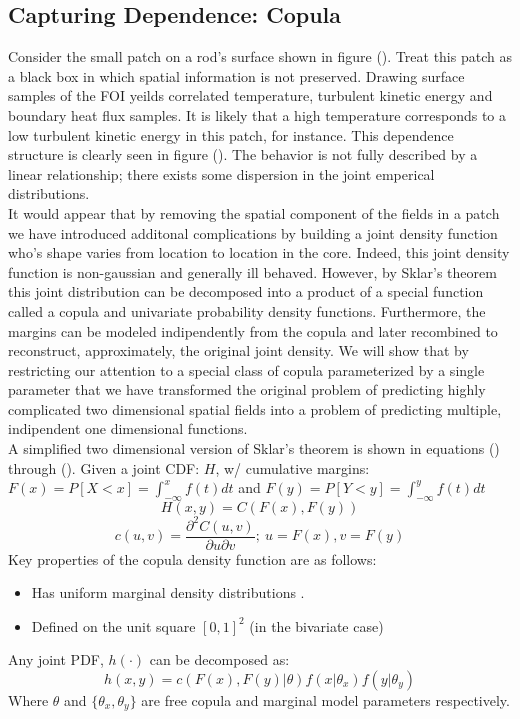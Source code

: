 \subsection{Capturing Dependence: Copula}

Consider the small patch on a rod's surface shown in figure ().  Treat this patch as a black box in which spatial information is not preserved. Drawing surface samples of the FOI yeilds correlated temperature, turbulent kinetic energy and boundary heat flux samples.  It is likely that a high temperature corresponds to a low turbulent kinetic energy in this patch, for instance.  This dependence structure is clearly seen in figure ().  The behavior is not fully described by a linear relationship; there exists some dispersion in the joint emperical distributions. \\

It would appear that by removing the spatial component of the fields in a patch we have introduced additonal complications by building a joint density function who's shape varies from location to location in the core.  Indeed, this joint density function is non-gaussian and generally ill behaved.  However, by Sklar's theorem this joint distribution can be decomposed into a product of a special function called a copula and univariate probability density functions.  Furthermore, the margins can be modeled indipendently from the copula and later recombined to reconstruct, approximately, the original joint density.  We will show that by restricting our attention to a special class of copula parameterized by a single parameter that we have transformed the original problem of predicting  highly complicated two dimensional spatial fields into a problem of predicting multiple, indipendent one dimensional functions. \\

A simplified two dimensional version of Sklar's theorem is shown in equations () through ().
Given a joint CDF: $H$, w/ cumulative margins: $F(x)=P[X < x] = \int_{-\infty}^{x}f(t)dt$
and $F(y)=P[Y < y] = \int_{-\infty}^{y}f(t)dt$
\begin{equation}
H(x,y) = C(F(x), F(y))
\end{equation}
\begin{equation}
c(u, v) = \frac{\partial^2 C(u, v)}{\partial u \partial v};\ u=F(x), v=F(y)
\end{equation}
Key properties of the copula density function are as follows:
\begin{itemize}
\item  Has uniform marginal density distributions \cite{Nelsen2006}.
\item  Defined on the unit square $[0, 1]^2$ (in the bivariate case)
\end{itemize}
Any joint PDF, $h(\cdot)$ can be decomposed as:
\begin{equation}
h(x, y) = c(F(x), F(y)|\theta)f(x|\theta_x)f(y|\theta_y)
\end{equation}
Where $\theta$ and $\{\theta_{x}, \theta_{y}\}$ are free copula and marginal model parameters respectively.

